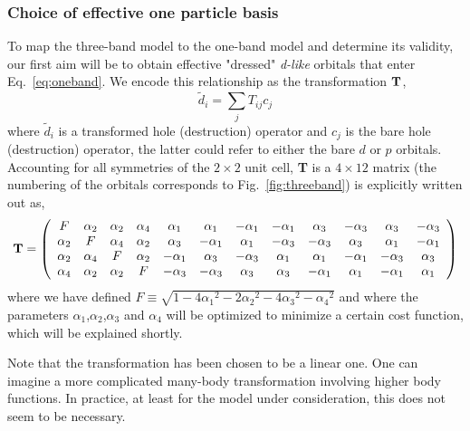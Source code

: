 \subsubsection{Choice of effective one particle basis}
To map the three-band model to the one-band model and determine its validity, 
our first aim will be to obtain effective "dressed" \emph{d-like} 
orbitals that enter Eq.~\ref{eq:oneband}. We encode this relationship as 
the transformation ${\bf T}$, 
\begin{equation}
	\tilde{d}_i = \sum_{j} T_{ij} c_j
\end{equation}
where $\tilde{d}_i$ is a transformed hole (destruction) operator and $c_j$ is the bare hole (destruction)
operator, the latter could refer to either the bare $d$ or $p$ orbitals. Accounting for all symmetries of 
the $2\times2$ unit cell, {\bf T} is a $4 \times 12 $ matrix (the numbering of the orbitals 
corresponds to Fig.~\ref{fig:threeband}) is explicitly written out as, 
\begin{eqnarray}
{\bf T} = 
\left(
\begin{array}{cccccccccccc}
F        & \alpha_2 &        \alpha_2 &  \alpha_4 & \alpha_1 & \alpha_1 & -\alpha_1 & -\alpha_1 & \alpha_3 & -\alpha_3 & \alpha_3 & -\alpha_3 \\
\alpha_2 &  F       &        \alpha_4 &  \alpha_2 & \alpha_3 & -\alpha_1 & \alpha_1 & -\alpha_3 & -\alpha_3 & \alpha_3 & \alpha_1 & -\alpha_1 \\
\alpha_2 & \alpha_4 & F               &  \alpha_2 & -\alpha_1 & \alpha_3 & -\alpha_3 & \alpha_1 & \alpha_1 & -\alpha_1 & -\alpha_3 & \alpha_3 \\
\alpha_4 & \alpha_2 & \alpha_2        &   F       & -\alpha_3 & -\alpha_3 & \alpha_3 & \alpha_3 & -\alpha_1 & \alpha_1 & -\alpha_1 & \alpha_1 \\
\end{array}
\right)
\end{eqnarray}
where we have defined $F \equiv \sqrt{1-4{\alpha_1}^2 - 2{\alpha_2}^2 - 4 {\alpha_3}^2 -{\alpha_4}^2}$ and 
where the parameters $\alpha_1$,$\alpha_2$,$\alpha_3$ and $\alpha_4$ will be 
optimized to minimize a certain cost function, which will be explained shortly. 

Note that the transformation has been chosen to be a linear one. One can imagine a more complicated 
many-body transformation involving higher body functions. In practice, at least for the model under 
consideration, this does not seem to be necessary. 

